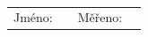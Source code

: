 \documentclass[10pt]{scrartcl}
\begin{document}
\author{\Author}
\title{\Title}
\date{\Labdate}



\setlength{\parindent}{0cm}
\begin{multicols}{2}
\textsf{\textbf{\Subject \hspace{11.25cm} \Institute}\\
\textbf{\large{\Title}}}

\begin{tabular}{rlrl}
	 \textsf{Jméno:} & \textbf{\textsf\Author}    &   \textsf{Měřeno:} & \textbf{\textsf{\Labdate}}    
\end{tabular}

\begin{flushright}


\end{flushright}
\end{multicols}
\end{document}
